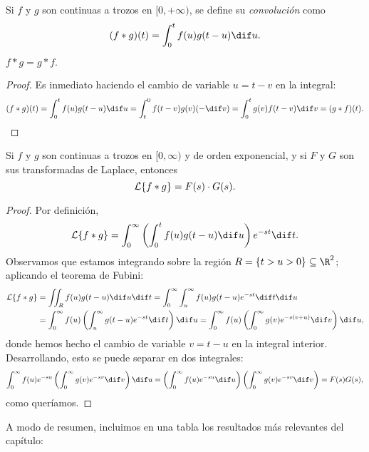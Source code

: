 \documentclass[../ecuaciones_diferenciales.tex]{subfiles}
\begin{document}
\begin{definition}
	Si \(f\) y \(g\) son continuas a trozos en \([0,+\infty)\), se define su
	\emph{convolución} como
	\[(f \ast g)(t) = \int_0^t f(u) g(t-u) \dif u.\]
\end{definition}

\begin{remark}
	\(f \ast g = g \ast f.\)
	\begin{proof}
		Es inmediato haciendo el cambio de variable \(u = t-v\) en la integral:
		\[(f \ast g)(t) = \int_0^t f(u) g(t-u) \dif u = \int_t^0 f(t-v)g(v)
			(-\dif v) = \int_0^t g(v) f(t-v) \dif v = (g \ast f)(t).\]
	\end{proof}
\end{remark}

\begin{theorem}
	Si \(f\) y \(g\) son continuas a trozos en \([0,\infty)\) y de orden
	exponencial, y si \(F\) y \(G\) son sus transformadas de Laplace, entonces
	\[\mathcal{L}\{f \ast g\} = F(s) \cdot G(s).\]
	\begin{proof}
		Por definición,
		\[\L\{f \ast g\} = \int_0^\infty \left( \int_0^t f(u)g(t-u) \dif u \right)
			e^{-st} \dif t.\]
		Observamos que estamos integrando sobre la región \(R = \{t > u > 0\} \subseteq
		\R^2\); aplicando el teorema de Fubini:
		\begin{align*}
			\L\{f \ast g\}
			 & = \iint_R f(u) g(t-u) \dif u \dif t
			= \int_0^\infty \int_u^\infty f(u)g(t-u)e^{-st} \dif t \dif u            \\
			 & = \int_0^\infty f(u) \left(\int_u^\infty g(t-u)e^{-st} \dif t \right)
			\dif u = \int_0^\infty f(u) \left( \int_0^\infty g(v)e^{-s(v+u)} \dif v
			\right) \dif u,
		\end{align*}
		donde hemos hecho el cambio de variable \(v = t-u\) en la integral
		interior. Desarrollando, esto se puede separar en dos integrales:
		\[\int_0^\infty f(u) e^{-su} \left( \int_0^\infty g(v)e^{-sv} \dif v \right) \dif u
			= \left( \int_0^\infty f(u)e^{-su} \dif u \right)
			\left( \int_0^\infty g(v)e^{-sv} \dif v \right)
			= F(s) G(s),\]
		como queríamos.
	\end{proof}
\end{theorem}

A modo de resumen, incluimos en una tabla los resultados más relevantes del
capítulo:
\end{document}
